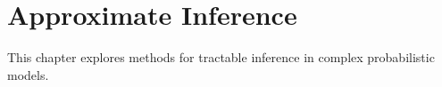
\chapter{Approximate Inference}
\label{chap:approximate-inference}

This chapter explores methods for tractable inference in complex probabilistic models.






